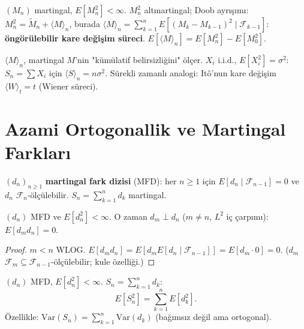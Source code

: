 \begin{ornek}
$(M_n)$ martingal, $E[M_n^2]<\infty$. $M_n^2$ altmartingal; Doob ayrışımı:
$M_n^2 = \widetilde{M}_n + \langle M\rangle_n$,
burada $\langle M\rangle_n = \sum_{k=1}^n E[(M_k-M_{k-1})^2\mid\mathcal{F}_{k-1}]$: \textbf{öngörülebilir kare değişim süreci}.
$E[\langle M\rangle_n] = E[M_n^2] - E[M_0^2]$.
\end{ornek}

\begin{sonuc}
$\langle M \rangle_n$, martingal $M$'nin "kümülatif belirsizliğini" ölçer.
$X_i$ i.i.d., $E[X_i^2]=\sigma^2$: $S_n = \sum X_i$ için $\langle S\rangle_n = n\sigma^2$.
Sürekli zamanlı analogi: Itô'nun kare değişim $\langle W\rangle_t = t$ (Wiener süreci).
\end{sonuc}

\section{Azami Ortogonallik ve Martingal Farkları}
\label{sec:martingal_farklari}

\begin{tanim}
$(d_n)_{n\geq1}$ \textbf{martingal fark dizisi} (MFD): her $n\geq1$ için
$E[d_n\mid\mathcal{F}_{n-1}] = 0$ ve $d_n$ $\mathcal{F}_n$-ölçülebilir.
$S_n = \sum_{k=1}^n d_k$ martingal.
\end{tanim}

\begin{onerme}
$(d_n)$ MFD ve $E[d_n^2]<\infty$. O zaman $d_m \perp d_n$ ($m\neq n$, $L^2$ iç çarpımı):
$E[d_m d_n] = 0$.
\end{onerme}

\begin{proof}
$m < n$ WLOG. $E[d_m d_n] = E[d_m E[d_n\mid\mathcal{F}_{n-1}]] = E[d_m \cdot 0] = 0$.
($d_m$ $\mathcal{F}_m \subseteq \mathcal{F}_{n-1}$-ölçülebilir; kule özelliği.)
\end{proof}

\begin{teorem}
$(d_n)$ MFD, $E[d_n^2]<\infty$. $S_n = \sum_{k=1}^n d_k$:
\[
  E[S_n^2] = \sum_{k=1}^n E[d_k^2].
\]
Özellikle: $\mathrm{Var}(S_n) = \sum_{k=1}^n \mathrm{Var}(d_k)$ (bağımsız değil ama ortogonal).
\end{teorem}

